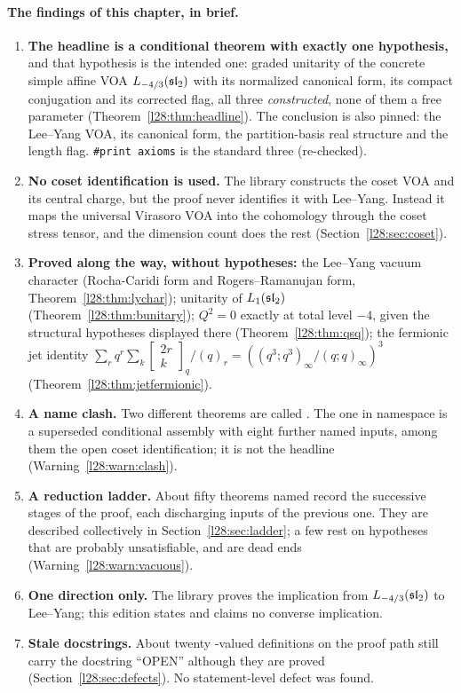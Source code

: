 \paragraph{The findings of this chapter, in brief.}
\begin{enumerate}
\item \textbf{The headline is a conditional theorem with exactly one hypothesis,} and that hypothesis is the intended
  one: graded unitarity of the concrete simple affine VOA $L_{-4/3}(\mathfrak{sl}_2)$ with its normalized canonical
  form, its compact conjugation and its corrected flag, all three \emph{constructed}, none of them a free parameter
  (Theorem~\ref{l28:thm:headline}). The conclusion is also pinned: the Lee--Yang VOA, its canonical form, the
  partition-basis real structure and the length flag. \texttt{\#print axioms} is the standard three (re-checked).
\item \textbf{No coset identification is used.} The library constructs the coset VOA and its central charge, but the
  proof never identifies it with Lee--Yang. Instead it maps the universal Virasoro VOA into the cohomology through the
  coset stress tensor, and the dimension count does the rest (Section~\ref{l28:sec:coset}).
\item \textbf{Proved along the way, without hypotheses:} the Lee--Yang vacuum character (Rocha-Caridi form and
  Rogers--Ramanujan form, Theorem~\ref{l28:thm:lychar}); unitarity of $L_1(\mathfrak{sl}_2)$
  (Theorem~\ref{l28:thm:bunitary}); $Q^2=0$ exactly at total level $-4$, given the structural hypotheses displayed there
(Theorem~\ref{l28:thm:qsq}); the fermionic
  jet identity $\sum_rq^r\sum_k\left[\begin{smallmatrix}2r\\k\end{smallmatrix}\right]_q/(q)_r=((q^3;q^3)_\infty/(q;q)_\infty)^3$
  (Theorem~\ref{l28:thm:jetfermionic}).
\item \textbf{A name clash.} Two different theorems are called . The one in
  namespace  is a superseded conditional assembly with eight further named inputs,
  among them the open coset identification; it is not the headline (Warning~\ref{l28:warn:clash}).
\item \textbf{A reduction ladder.} About fifty theorems named  record the
  successive stages of the proof, each discharging inputs of the previous one. They are described collectively in
  Section~\ref{l28:sec:ladder}; a few rest on hypotheses that are probably unsatisfiable, and are dead ends
  (Warning~\ref{l28:warn:vacuous}).
\item \textbf{One direction only.} The library proves the implication from $L_{-4/3}(\mathfrak{sl}_2)$ to Lee--Yang; this
  edition states and claims no converse implication.
\item \textbf{Stale docstrings.} About twenty -valued definitions on the proof path still carry the
  docstring ``OPEN'' although they are proved (Section~\ref{l28:sec:defects}). No statement-level defect was found.
\end{enumerate}

